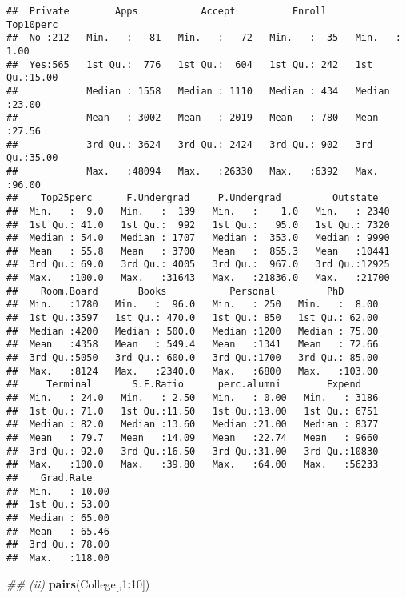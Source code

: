 \documentclass[]{article}
\newenvironment{Shaded}{\begin{snugshade}}{\end{snugshade}}
\newcommand{\CommentTok}[1]{\textcolor[rgb]{0.56,0.35,0.01}{\textit{#1}}}
\newcommand{\DecValTok}[1]{\textcolor[rgb]{0.00,0.00,0.81}{#1}}
\newcommand{\KeywordTok}[1]{\textcolor[rgb]{0.13,0.29,0.53}{\textbf{#1}}}
\newcommand{\NormalTok}[1]{#1}
\newcommand{\OperatorTok}[1]{\textcolor[rgb]{0.81,0.36,0.00}{\textbf{#1}}}
\begin{document}
\begin{verbatim}
##  Private        Apps           Accept          Enroll       Top10perc    
##  No :212   Min.   :   81   Min.   :   72   Min.   :  35   Min.   : 1.00  
##  Yes:565   1st Qu.:  776   1st Qu.:  604   1st Qu.: 242   1st Qu.:15.00  
##            Median : 1558   Median : 1110   Median : 434   Median :23.00  
##            Mean   : 3002   Mean   : 2019   Mean   : 780   Mean   :27.56  
##            3rd Qu.: 3624   3rd Qu.: 2424   3rd Qu.: 902   3rd Qu.:35.00  
##            Max.   :48094   Max.   :26330   Max.   :6392   Max.   :96.00  
##    Top25perc      F.Undergrad     P.Undergrad         Outstate    
##  Min.   :  9.0   Min.   :  139   Min.   :    1.0   Min.   : 2340  
##  1st Qu.: 41.0   1st Qu.:  992   1st Qu.:   95.0   1st Qu.: 7320  
##  Median : 54.0   Median : 1707   Median :  353.0   Median : 9990  
##  Mean   : 55.8   Mean   : 3700   Mean   :  855.3   Mean   :10441  
##  3rd Qu.: 69.0   3rd Qu.: 4005   3rd Qu.:  967.0   3rd Qu.:12925  
##  Max.   :100.0   Max.   :31643   Max.   :21836.0   Max.   :21700  
##    Room.Board       Books           Personal         PhD        
##  Min.   :1780   Min.   :  96.0   Min.   : 250   Min.   :  8.00  
##  1st Qu.:3597   1st Qu.: 470.0   1st Qu.: 850   1st Qu.: 62.00  
##  Median :4200   Median : 500.0   Median :1200   Median : 75.00  
##  Mean   :4358   Mean   : 549.4   Mean   :1341   Mean   : 72.66  
##  3rd Qu.:5050   3rd Qu.: 600.0   3rd Qu.:1700   3rd Qu.: 85.00  
##  Max.   :8124   Max.   :2340.0   Max.   :6800   Max.   :103.00  
##     Terminal       S.F.Ratio      perc.alumni        Expend     
##  Min.   : 24.0   Min.   : 2.50   Min.   : 0.00   Min.   : 3186  
##  1st Qu.: 71.0   1st Qu.:11.50   1st Qu.:13.00   1st Qu.: 6751  
##  Median : 82.0   Median :13.60   Median :21.00   Median : 8377  
##  Mean   : 79.7   Mean   :14.09   Mean   :22.74   Mean   : 9660  
##  3rd Qu.: 92.0   3rd Qu.:16.50   3rd Qu.:31.00   3rd Qu.:10830  
##  Max.   :100.0   Max.   :39.80   Max.   :64.00   Max.   :56233  
##    Grad.Rate     
##  Min.   : 10.00  
##  1st Qu.: 53.00  
##  Median : 65.00  
##  Mean   : 65.46  
##  3rd Qu.: 78.00  
##  Max.   :118.00
\end{verbatim}

\begin{Shaded}
\begin{Highlighting}[]
\CommentTok{## (ii)}
\KeywordTok{pairs}\NormalTok{(College[,}\DecValTok{1}\OperatorTok{:}\DecValTok{10}\NormalTok{])}
\end{Highlighting}
\end{Shaded}
\end{document}
